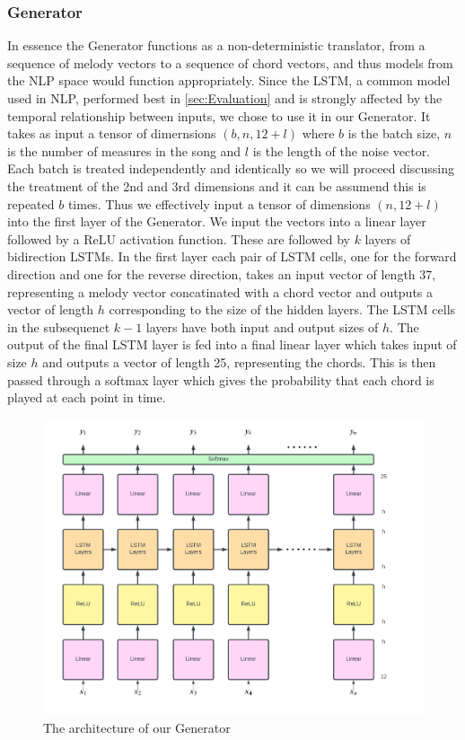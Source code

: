 \subsubsection{Generator}
In essence the Generator functions as a non-deterministic translator, from a sequence of melody vectors to a sequence of chord vectors, and thus models from the NLP space would function appropriately.
Since the LSTM, a common model used in NLP, performed best in \ref{sec:Evaluation} and is strongly affected by the temporal relationship between inputs, we chose to use it in our Generator.
It takes as input a tensor of dimernsions $(b,n,12+l)$ where $b$ is the batch size, $n$ is the number of measures in the song and $l$ is the length of the noise vector.
Each batch is treated independently and identically so we will proceed discussing the treatment of the 2nd and 3rd dimensions and it can be assumend this is repeated $b$ times.
Thus we effectively input a tensor of dimensions $(n,12+l)$ into the first layer of the Generator.
We input the vectors into a linear layer followed by a ReLU activation function. 
These are followed by $k$ layers of bidirection LSTMs.
In the first layer each pair of LSTM cells, one for the forward direction and one for the reverse direction, takes an input vector of length 37, representing a melody vector concatinated with a chord vector and outputs a vector of length $h$ corresponding to the size of the hidden layers.
The LSTM cells in the subsequenct $k-1$ layers have both input and output sizes of $h$.
The output of the final LSTM layer is fed into a final linear layer which takes input of size $h$ and outputs a vector of length 25, representing the chords.
This is then passed through a softmax layer which gives the probability that each chord is played at each point in time.

\begin{figure}
    \centering
    \includegraphics[width=0.8\columnwidth]{Figures/Generator}
    \decoRule
    \caption{The architecture of our Generator}
    \label{fig:Generator}
\end{figure}

